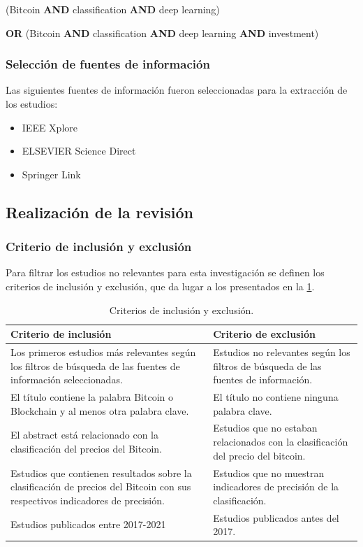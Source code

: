 \centerline{(Bitcoin \textbf{AND} classification \textbf{AND} deep learning)} 
\centerline{\textbf{OR} (Bitcoin \textbf{AND} classification \textbf{AND} deep learning \textbf{AND} investment)}

\subsubsection{Selección de fuentes de información}
Las siguientes fuentes de información fueron seleccionadas para la extracción de los estudios:\\
\begin{itemize}
	\item IEEE Xplore
	\item ELSEVIER Science Direct
	\item Springer Link\\
\end{itemize}
\subsection{Realización de la revisión}
\subsubsection{Criterio de inclusión y exclusión}
Para filtrar los estudios no relevantes para esta investigación se definen los criterios de inclusión y exclusión, que da lugar a los presentados en la \cref{tab:Table6}.\\

\begin{table}[h!]
	\centering
	\begin{tabular}{ | m{7cm}| m{7cm} | }
		\hline
		\textbf{Criterio de inclusión} & \textbf{Criterio de exclusión}\\
		\hline
		Los primeros estudios más relevantes según los filtros de búsqueda de las fuentes de información seleccionadas.& Estudios no relevantes según los filtros de búsqueda de las fuentes de información.\\
		\hline
		El título contiene la palabra Bitcoin o Blockchain y al menos otra palabra clave.&  El título no contiene ninguna palabra clave.\\ 
		\hline
		El abstract está relacionado con la clasificación del precios del Bitcoin.& Estudios que no estaban relacionados con la clasificación del precio del bitcoin.\\
		\hline
		Estudios que contienen resultados sobre la clasificación de precios del Bitcoin con sus respectivos indicadores de precisión.& Estudios que no muestran indicadores de precisión de la clasificación.\\
		\hline
		Estudios publicados entre 2017-2021&Estudios publicados antes del 2017.\\
		\hline
	\end{tabular}
	\caption{Criterios de inclusión y exclusión.}
	\label{tab:Table6}
\end{table}

